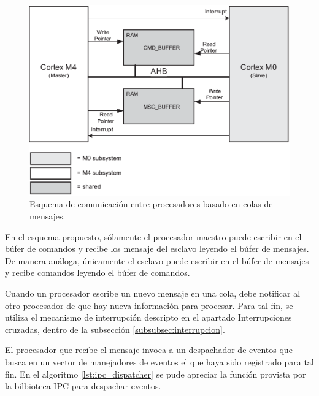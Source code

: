 \begin{figure}[!htpb]
	\centering
	\includegraphics[width=\textwidth]{./Figures/IPC.png}
	\caption[Esquema de comunicación entre procesadores]{Esquema de comunicación entre procesadores basado en colas de mensajes\protect\footnotemark.}
	\label{fig:IPC}
\end{figure}

\vspace{15px}
{}

En el esquema propuesto, sólamente el procesador maestro puede escribir en el búfer de comandos y recibe los mensaje del esclavo leyendo el búfer de mensajes.  De manera análoga, únicamente el esclavo puede escribir en el búfer de mensajes y recibe comandos leyendo el búfer de comandos.

Cuando un procesador escribe un nuevo mensaje en una cola, debe notificar al otro procesador de que hay nueva información para procesar. Para tal fin, se utiliza el mecanismo de interrupción descripto en el apartado Interrupciones cruzadas, dentro de la subsección \ref{subsubsec:interrupcion}.

El procesador que recibe el mensaje invoca a un despachador de eventos que busca en un vector de manejadores de eventos el que haya sido registrado para tal fin. En el algoritmo \ref{lst:ipc_dispatcher} se pude apreciar la función provista por la bilbioteca IPC para despachar eventos.

\vspace{10px}

